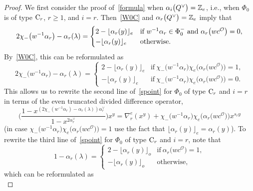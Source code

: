 \begin{proof}
We first consider the proof of~\eqref{formula} when $\alpha_i\smash{\bigl(Q^\vee\bigr)}=\mathbb{Z}_e$, i.e., when $\Phi_0$ is of type ${\rm C}_r$, $r\geq 1$, and $i=r$.
Then~\eqref{W0C} and $\alpha_r\smash{\bigl(Q^\vee\bigr)}=\mathbb{Z}_e$ imply that
\begin{equation*}
2\chi_-\bigl(w^{-1}\alpha_r\bigr)-\alpha_r(\lambda)=
\begin{cases}
2-\lfloor\alpha_r(y)\rfloor_e &\hbox{if }  w^{-1}\alpha_r\in\Phi_0^-\ \text{and}\ \alpha_r\bigl(wc^\mathcal{O}\bigr)=0,\\
-\lfloor\alpha_r(y)\rfloor_e &\textup{otherwise}.
\end{cases}
\end{equation*}
By~\eqref{W0C},
this can be reformulated as
\begin{equation*}%
2\chi_-\bigl(w^{-1}\alpha_r\bigr)-\alpha_r(\lambda)=
\begin{cases}
2-\lfloor\alpha_r(y)\rfloor_e &\text{if}\ \chi_-\bigl(w^{-1}\alpha_r\bigr)\chi_e\bigl(\alpha_r\bigl(wc^\mathcal{O}\bigr)\bigr)=1,\\
-\lfloor\alpha_r(y)\rfloor_e &\text{if}\ \chi_-\bigl(w^{-1}\alpha_r\bigr)\chi_e\bigl(\alpha_r\bigl(wc^\mathcal{O}\bigr)\bigr)=0.
\end{cases}
\end{equation*}
This allows us to rewrite the second line of~\eqref{spoint} for $\Phi_0$ of type ${\rm C}_r$ and $i=r$ in terms of the even truncated divided difference operator,
\begin{equation}\label{claim1}
\Biggl(\frac{1-x^{(2\chi_-(w^{-1}\alpha_r)-\alpha_r(\lambda))\alpha_r^\vee}}{1-x^{2\alpha_r^\vee}}\Biggr)x^{y}=
\nabla_r^e(x^y)+
\chi_-\bigl(w^{-1}\alpha_r\bigr)\chi_e\bigl(\alpha_r\bigl(wc^\mathcal{O}\bigr)\bigr)x^{s_ry}
\end{equation}
\big(in case $\chi_-\bigl(w^{-1}\alpha_r\bigr)\chi_e\bigl(\alpha_r\bigl(wc^\mathcal{O}\bigr)\bigr)=1$ use the fact that $\lfloor\alpha_r(y)\rfloor_e=\alpha_r(y)$\big).
To rewrite the third line of~\eqref{spoint} for $\Phi_0$ of type ${\rm C}_r$ and $i=r$, note that
\begin{equation*}
1-\alpha_r(\lambda)=
\begin{cases}
2-\lfloor\alpha_r(y)\rfloor_o &\text{if}\ \alpha_r\bigl(wc^\mathcal{O}\bigr)=1,\\
-\lfloor\alpha_r(y)\rfloor_o &\text{otherwise},
\end{cases}
\end{equation*}
which can be reformulated as
\begin{equation*}%

\end{equation*}
\end{proof}
